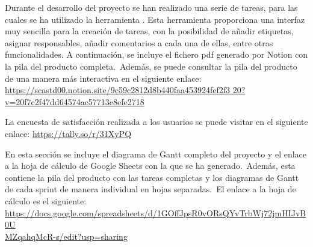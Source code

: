 


Durante el desarrollo del proyecto se han realizado una serie de tareas, para las cuales se ha utilizado la
herramienta .
Esta herramienta proporciona una interfaz muy sencilla para la creación de tareas, con la
posibilidad de añadir etiquetas, asignar responsables, añadir comentarios a cada una de ellas,
entre otras funcionalidades.
A continuación, se incluye el fichero pdf generado por Notion con la pila del producto completa.\ Además, se puede
consultar la pila del producto de una manera más interactiva en el siguiente enlace:
\href{https://scastd00.notion.site/9c59c2812d8b440faa453924fef2f320?v=20f7c2f47dd64574ac57713e8efe2718}
{https://scastd00.notion.site/9c59c2812d8b440faa453924fef2f3
20?v=20f7c2f47dd64574ac57713e8efe2718}

\label{anx:product-backlog-notion}




La encuesta de satisfacción realizada a los usuarios se puede visitar en el siguiente enlace:
\href{https://tally.so/r/31XyPQ}{https://tally.so/r/31XyPQ}
\label{anx:encuesta-satisfaccion}



En esta sección se incluye el diagrama de Gantt completo del proyecto y el enlace a la hoja de cálculo de Google
Sheets con la que se ha generado.\ Además, esta contiene la pila del producto con las tareas completas y los diagramas
de Gantt de cada sprint de manera individual en hojas separadas.\ El enlace a la hoja de cálculo es el siguiente:
\href{https://docs.google.com/spreadsheets/d/1GOffJpsR0vORsQYvTrbWj72jmHIJvB0UMZqahqMcR-s/edit?usp=sharing}
{https://docs.google.com/spreadsheets/d/1GOffJpsR0vORsQYvTrbWj72jmHIJvB0U\\MZqahqMcR-s/edit?usp=sharing}

